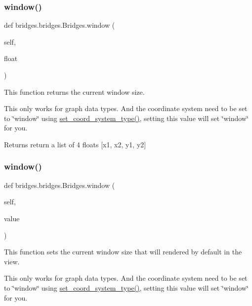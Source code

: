 \subsubsection{\texorpdfstring{window()}{window()}\hspace{0.1cm}{\footnotesize\ttfamily [1/2]}}
{\footnotesize\ttfamily def bridges.\+bridges.\+Bridges.\+window (\begin{DoxyParamCaption}\item[{}]{self,  }\item[{}]{float }\end{DoxyParamCaption})}



This function returns the current window size. 

This only works for graph data types. And the coordinate system need to be set to \char`\"{}window\char`\"{} using \hyperlink{classbridges_1_1bridges_1_1_bridges_a6bc905490b1995234f88f47af9aa8a17}{set\+\_\+coord\+\_\+system\+\_\+type()}, setting this value will set \char`\"{}window\char`\"{} for you. \begin{DoxyReturn}{Returns}
return a list of 4 floats \mbox{[}x1, x2, y1, y2\mbox{]} 
\end{DoxyReturn}
\mbox{\label{classbridges_1_1bridges_1_1_bridges_ab434ee3f7b3b8c9eb4f8a07d97789a82}} 
\subsubsection{\texorpdfstring{window()}{window()}\hspace{0.1cm}{\footnotesize\ttfamily [2/2]}}
{\footnotesize\ttfamily def bridges.\+bridges.\+Bridges.\+window (\begin{DoxyParamCaption}\item[{}]{self,  }\item[{}]{value }\end{DoxyParamCaption})}



This function sets the current window size that will rendered by default in the view. 

This only works for graph data types. And the coordinate system need to be set to \char`\"{}window\char`\"{} using \hyperlink{classbridges_1_1bridges_1_1_bridges_a6bc905490b1995234f88f47af9aa8a17}{set\+\_\+coord\+\_\+system\+\_\+type()}, setting this value will set \char`\"{}window\char`\"{} for you. 

